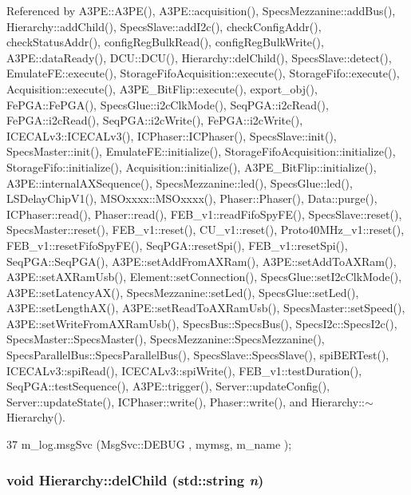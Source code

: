 Referenced by A3PE::A3PE(), A3PE::acquisition(), SpecsMezzanine::addBus(), Hierarchy::addChild(), SpecsSlave::addI2c(), checkConfigAddr(), checkStatusAddr(), configRegBulkRead(), configRegBulkWrite(), A3PE::dataReady(), DCU::DCU(), Hierarchy::delChild(), SpecsSlave::detect(), EmulateFE::execute(), StorageFifoAcquisition::execute(), StorageFifo::execute(), Acquisition::execute(), A3PE\_\-BitFlip::execute(), export\_\-obj(), FePGA::FePGA(), SpecsGlue::i2cClkMode(), SeqPGA::i2cRead(), FePGA::i2cRead(), SeqPGA::i2cWrite(), FePGA::i2cWrite(), ICECALv3::ICECALv3(), ICPhaser::ICPhaser(), SpecsSlave::init(), SpecsMaster::init(), EmulateFE::initialize(), StorageFifoAcquisition::initialize(), StorageFifo::initialize(), Acquisition::initialize(), A3PE\_\-BitFlip::initialize(), A3PE::internalAXSequence(), SpecsMezzanine::led(), SpecsGlue::led(), LSDelayChipV1(), MSOxxxx::MSOxxxx(), Phaser::Phaser(), Data::purge(), ICPhaser::read(), Phaser::read(), FEB\_\-v1::readFifoSpyFE(), SpecsSlave::reset(), SpecsMaster::reset(), FEB\_\-v1::reset(), CU\_\-v1::reset(), Proto40MHz\_\-v1::reset(), FEB\_\-v1::resetFifoSpyFE(), SeqPGA::resetSpi(), FEB\_\-v1::resetSpi(), SeqPGA::SeqPGA(), A3PE::setAddFromAXRam(), A3PE::setAddToAXRam(), A3PE::setAXRamUsb(), Element::setConnection(), SpecsGlue::setI2cClkMode(), A3PE::setLatencyAX(), SpecsMezzanine::setLed(), SpecsGlue::setLed(), A3PE::setLengthAX(), A3PE::setReadToAXRamUsb(), SpecsMaster::setSpeed(), A3PE::setWriteFromAXRamUsb(), SpecsBus::SpecsBus(), SpecsI2c::SpecsI2c(), SpecsMaster::SpecsMaster(), SpecsMezzanine::SpecsMezzanine(), SpecsParallelBus::SpecsParallelBus(), SpecsSlave::SpecsSlave(), spiBERTest(), ICECALv3::spiRead(), ICECALv3::spiWrite(), FEB\_\-v1::testDuration(), SeqPGA::testSequence(), A3PE::trigger(), Server::updateConfig(), Server::updateState(), ICPhaser::write(), Phaser::write(), and Hierarchy::$\sim$Hierarchy().


\begin{DoxyCode}
37 { m_log.msgSvc (MsgSvc::DEBUG   , mymsg, m_name ); }
\end{DoxyCode}
\hypertarget{classHierarchy_a1928ac7615fe0b5e55cd707f70dc6781}{
\subsubsection[{delChild}]{\setlength{\rightskip}{0pt plus 5cm}void Hierarchy::delChild (std::string {\em n})}}
\label{classHierarchy_a1928ac7615fe0b5e55cd707f70dc6781}


